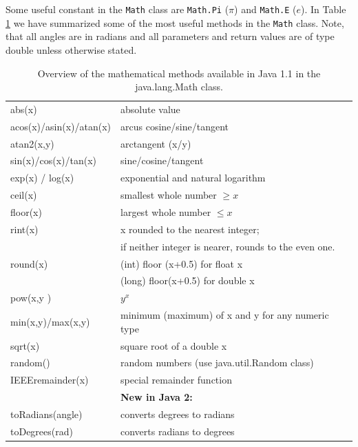Some useful constant in the \verb|Math| class  are \verb|Math.Pi|
($\pi$) and \verb|Math.E| ($e$).
In Table \ref{tab:math_table} 
we have summarized some of the most useful methods in the \verb|Math| class. 
Note, that all angles are in radians and all parameters and
return values are of type double unless otherwise stated. 
\begin{table}[htbp]
  \begin{center}
    \leavevmode
    \begin{tabular}{ll}
      abs(x) & absolute value \\
      acos(x)/asin(x)/atan(x) & arcus cosine/sine/tangent \\
      atan2(x,y) & arctangent (x/y)  \\
      sin(x)/cos(x)/tan(x) & sine/cosine/tangent\\
      exp(x) / log(x) & exponential and natural logarithm \\
      ceil(x) & smallest whole number $\ge x$ \\
      floor(x) & largest whole number $\le x$ \\
      rint(x) & x rounded to the nearest integer; \\
             &  if neither integer is
                        nearer, rounds to the even one. \\
      round(x) & (int) floor (x+0.5) for float x \\
       ~       & (long) floor(x+0.5) for double x \\
      pow(x,y ) & $y^x$\\
      min(x,y)/max(x,y)  & minimum (maximum)  of x and y for any numeric type  \\
      sqrt(x) & square root of a double x\\
      random() & random numbers (use java.util.Random class)\\
      IEEEremainder(x) & special remainder function \\\hline
      & \textbf{New in Java 2:} \\
      toRadians(angle) & converts degrees to radians\\
      toDegrees(rad) & converts radians to degrees \
    \end{tabular}
    \caption{Overview of the mathematical 
      methods available in Java 1.1 in the java.lang.Math class.}
    \label{tab:math_table}
  \end{center}
\end{table}

